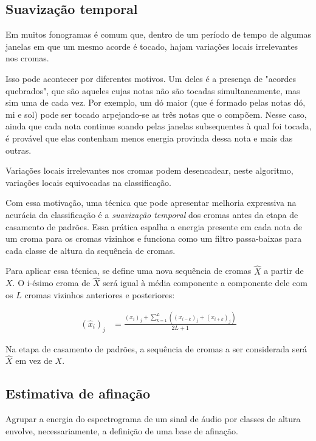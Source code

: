     \subsection{Suavização temporal}
        Em muitos fonogramas é comum que, dentro de um período de tempo de algumas janelas em que um mesmo acorde é tocado, hajam variações locais irrelevantes nos cromas.
        
        Isso pode acontecer por diferentes motivos. Um deles é a presença de "acordes quebrados", que são aqueles cujas notas não são tocadas simultaneamente, mas sim uma de cada vez. Por exemplo, um dó maior (que é formado pelas notas dó, mi e sol) pode ser tocado arpejando-se as três notas que o compõem. Nesse caso, ainda que cada nota continue soando pelas janelas subsequentes à qual foi tocada, é provável que elas contenham menos energia provinda dessa nota e mais das outras.
        
        Variações locais irrelevantes nos cromas podem desencadear, neste algoritmo, variações locais equivocadas na classificação.
        
        Com essa motivação, uma técnica que pode apresentar melhoria expressiva na acurácia da classificação é a \textit{suavização temporal} dos cromas antes da etapa de casamento de padrões. Essa prática espalha a energia presente em cada nota de um croma para os cromas vizinhos e funciona como um filtro passa-baixas para cada classe de altura da sequência de cromas.
        
        Para aplicar essa técnica, se define uma nova sequência de cromas $\hat{X}$ a partir de $X$. O i-ésimo croma de $\hat{X}$ será igual à média componente a componente dele com os $L$ cromas vizinhos anteriores e posteriores:
        
        \[
            \begin{split}
                (\hat{x}_i)_j   &= \frac{(x_i)_j + \sum_{k = 1}^L ((x_{i - k})_j + (x_{i + k})_j)}{2L + 1}
            \end{split}
        \]
        
        Na etapa de casamento de padrões, a sequência de cromas a ser considerada será $\hat{X}$ em vez de $X$.
        
    \subsection{Estimativa de afinação}
        Agrupar a energia do espectrograma de um sinal de áudio por classes de altura envolve, necessariamente, a definição de uma base de afinação.

